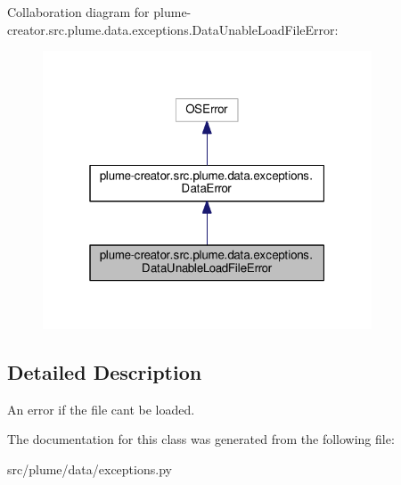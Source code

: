 Collaboration diagram for plume-\/creator.src.\+plume.\+data.\+exceptions.\+Data\+Unable\+Load\+File\+Error\+:
\nopagebreak
\begin{figure}[H]
\begin{center}
\leavevmode
\includegraphics[width=277pt]{classplume-creator_1_1src_1_1plume_1_1data_1_1exceptions_1_1_data_unable_load_file_error__coll__graph}
\end{center}
\end{figure}


\subsection{Detailed Description}
An error if the file can\textquotesingle{}t be loaded. 

The documentation for this class was generated from the following file\+:\begin{DoxyCompactItemize}
\item 
src/plume/data/exceptions.\+py\end{DoxyCompactItemize}
